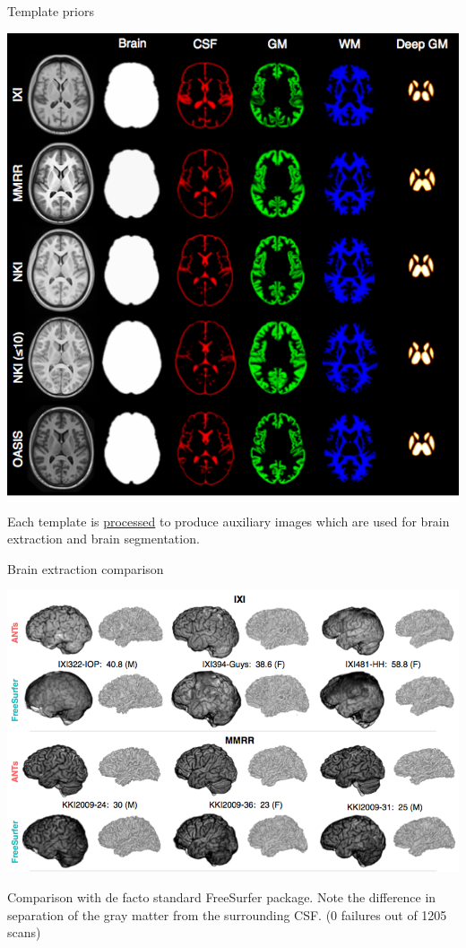 \documentclass[ignorenonframetext,]{beamer}
\begin{document}
\begin{frame}{Template priors}

\includegraphics{./evaluation/figures/templatePriors.png}

Each template is
\href{https://github.com/ntustison/antsCookTemplatePriorsExample}{processed}
to produce auxiliary images which are used for brain extraction and
brain segmentation.

\end{frame}

\begin{frame}{Brain extraction comparison}

\includegraphics{./evaluation/figures/brainExtraction.png}

Comparison with de facto standard FreeSurfer package. Note the
difference in separation of the gray matter from the surrounding CSF. (0
failures out of 1205 scans)

\end{frame}
\end{document}
